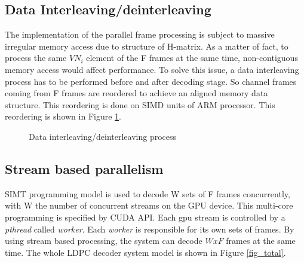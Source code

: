 \documentclass[conference]{IEEEtran}
\begin{document}
\subsection{Data Interleaving/deinterleaving}
The implementation of the parallel frame processing is subject to massive irregular memory access due to structure of H-matrix. As a matter of fact, to process the same $VN_i$ element of the F frames at the same time, non-contiguous memory access would affect performance. To solve this issue, a data interleaving process has to be performed before and after decoding stage. So channel frames coming from F frames are reordered to achieve an aligned memory data structure. This reordering is done on SIMD units of ARM processor. This reordering is shown in Figure \ref{fig_intreleave}.

\begin{figure}[h]
\begin{centering}
\caption[width=.3\textwidth]{Data interleaving/deinterleaving process}
\label{fig_intreleave}
\end{centering}
\end{figure}

\subsection{Stream based parallelism}

SIMT programming model is used to decode W sets of F frames concurrently, with W the number of concurrent streams on the GPU device. This multi-core programming is specified by CUDA API. Each gpu stream is controlled by a \textit{pthread} called \textit{worker}. Each \textit{worker} is responsible for its own sets of frames. By using stream based processing, the system can decode $W x F$ frames at the same time. The whole LDPC decoder system model is shown in Figure \ref{fig_total}.
\end{document}
